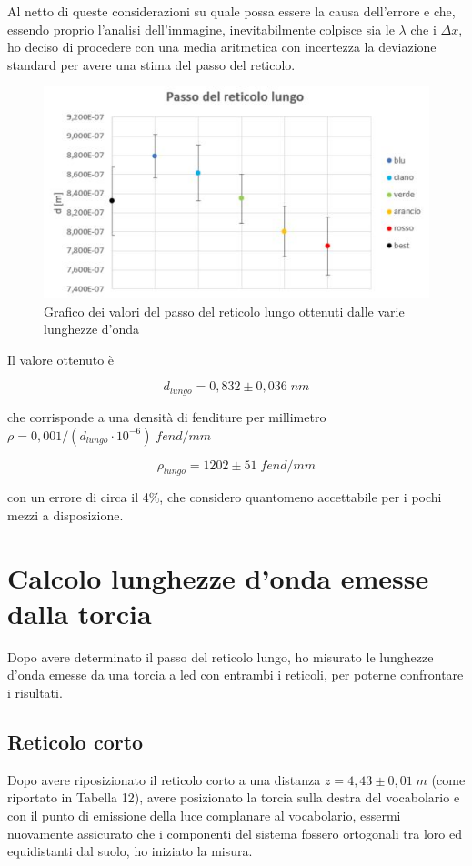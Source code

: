 \documentclass{article}
\begin{document}
\vspace{3mm}

Al netto di queste considerazioni su quale possa essere la causa dell'errore e che, essendo proprio l'analisi dell'immagine, inevitabilmente colpisce sia le $\lambda$ che i $\Delta x$, ho deciso di procedere con una media aritmetica con incertezza la deviazione standard per avere una stima del passo del reticolo.

\begin{figure}[h]
    \centering
    \includegraphics[width=0.6\linewidth]{graph_d.JPG}
    \caption{Grafico dei valori del passo del reticolo lungo ottenuti dalle varie lunghezze d'onda}
    \label{graph_d}
\end{figure}

Il valore ottenuto è 

\[d_{lungo} = 0,832 \pm 0,036 \; nm\]

che corrisponde a una densità di fenditure per millimetro $\rho = 0,001/(d_{lungo}\cdot 10^{-6}) \; fend/mm $

\[\rho_{lungo} = 1202 \pm 51 \; fend/mm\]

con un errore di circa il 4\%, che considero quantomeno accettabile per i pochi mezzi a disposizione.

\section{Calcolo lunghezze d'onda emesse dalla torcia}
Dopo avere determinato il passo del reticolo lungo, ho misurato le lunghezze d'onda emesse da una torcia a led con entrambi i reticoli, per poterne confrontare i risultati.

\subsection{Reticolo corto}
Dopo avere riposizionato il reticolo corto a una distanza $z = 4,43 \pm 0,01 \; m$ (come riportato in Tabella 12), avere posizionato la torcia sulla destra del vocabolario e con il punto di emissione della luce complanare al vocabolario, essermi nuovamente assicurato che i componenti del sistema fossero ortogonali tra loro ed equidistanti dal suolo, ho iniziato la misura.
\end{document}
